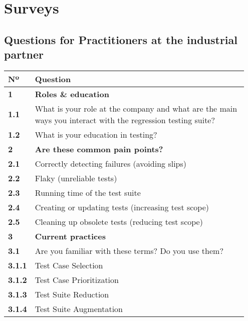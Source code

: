 \chapter{Surveys}\label{app:surveys}


\section{Questions for Practitioners at the industrial partner}

\begin{table}[]
\centering
{}
\begin{tabular}{p{0.05\linewidth}p{0.9\linewidth}}
\toprule
\textbf{Nº} & \textbf{Question} \\
\midrule
\textbf{1} & \textbf{Roles \& education} \\
\textbf{1.1} & What is your role at the company and what are the main ways you interact with the regression testing suite? \\
\textbf{1.2} & What is your education in testing? \\
\midrule
\textbf{2} & \textbf{Are these common pain points?} \\
\textbf{2.1} & Correctly detecting failures (avoiding slips) \\
\textbf{2.2} & Flaky (unreliable tests) \\
\textbf{2.3} & Running time of the test suite \\
\textbf{2.4} & Creating or updating tests (increasing test scope) \\
\textbf{2.5} & Cleaning up obsolete tests (reducing test scope) \\
\midrule
\textbf{3} & \textbf{Current practices} \\
\textbf{3.1} & Are you familiar with these terms? Do you use them? \\
\textbf{3.1.1} & Test Case Selection \\
\textbf{3.1.2} & Test Case Prioritization \\
\textbf{3.1.3} & Test Suite Reduction \\
\textbf{3.1.4} & Test Suite Augmentation \\

\end{tabular}
\end{table}
